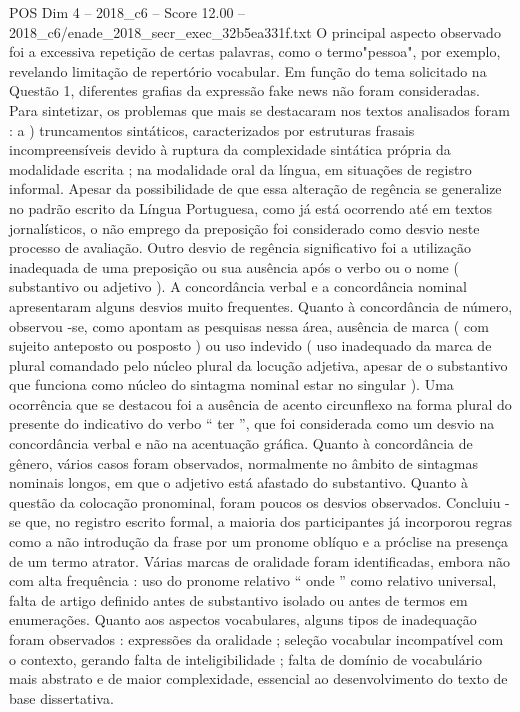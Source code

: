 \begin{textsample}{POS Dim 4 – 2018\_c6 – Score 12.00 – 2018\_c6/enade\_2018\_secr\_exec\_32b5ea331f.txt}
O principal aspecto observado foi a excessiva repetição de certas palavras, como o termo"pessoa", por exemplo, revelando limitação de repertório vocabular.
Em função do tema solicitado na Questão 1, diferentes grafias da expressão fake news não foram consideradas.
Para sintetizar, os problemas que mais se destacaram nos textos analisados foram : a ) truncamentos sintáticos, caracterizados por estruturas frasais incompreensíveis devido à ruptura da complexidade sintática própria da modalidade escrita ; na modalidade oral da língua, em situações de registro informal.
Apesar da possibilidade de que essa alteração de regência se generalize no padrão escrito da Língua Portuguesa, como já está ocorrendo até em textos jornalísticos, o não emprego da preposição foi considerado como desvio neste processo de avaliação.
Outro desvio de regência significativo foi a utilização inadequada de uma preposição ou sua ausência após o verbo ou o nome ( substantivo ou adjetivo ).
A concordância verbal e a concordância nominal apresentaram alguns desvios muito frequentes.
Quanto à concordância de número, observou -se, como apontam as pesquisas nessa área, ausência de marca ( com sujeito anteposto ou posposto ) ou uso indevido ( uso inadequado da marca de plural comandado pelo núcleo plural da locução adjetiva, apesar de o substantivo que funciona como núcleo do sintagma nominal estar no singular ).
Uma ocorrência que se destacou foi a ausência de acento circunflexo na forma plural do presente do indicativo do verbo “ ter ”, que foi considerada como um desvio na concordância verbal e não na acentuação gráfica.
Quanto à concordância de gênero, vários casos foram observados, normalmente no âmbito de sintagmas nominais longos, em que o adjetivo está afastado do substantivo.
Quanto à questão da colocação pronominal, foram poucos os desvios observados.
Concluiu -se que, no registro escrito formal, a maioria dos participantes já incorporou regras como a não introdução da frase por um pronome oblíquo e a próclise na presença de um termo atrator.
Várias marcas de oralidade foram identificadas, embora não com alta frequência : uso do pronome relativo “ onde ” como relativo universal, falta de artigo definido antes de substantivo isolado ou antes de termos em enumerações.
Quanto aos aspectos vocabulares, alguns tipos de inadequação foram observados : expressões da oralidade ; seleção vocabular incompatível com o contexto, gerando falta de inteligibilidade ; falta de domínio de vocabulário mais abstrato e de maior complexidade, essencial ao desenvolvimento do texto de base dissertativa.

\end{textsample}
